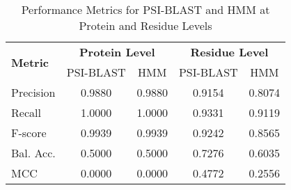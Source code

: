 \begin{table}[h!]
    \centering
    \small
    \caption{Performance Metrics for PSI-BLAST and HMM at Protein and Residue Levels}
    \label{tab:metrics}
    \begin{tabular}{lcccc}
        \toprule
        \multirow{2}{*}{\textbf{Metric}} & \multicolumn{2}{c}{\textbf{Protein Level}} & \multicolumn{2}{c}{\textbf{Residue Level}} \\
        \cmidrule(lr){2-3} \cmidrule(lr){4-5}
        & PSI-BLAST & HMM & PSI-BLAST & HMM \\
        \midrule
        Precision & 0.9880 & 0.9880 & 0.9154 & 0.8074 \\
        Recall & 1.0000 & 1.0000 & 0.9331 & 0.9119 \\
        F-score & 0.9939 & 0.9939 & 0.9242 & 0.8565 \\
        Bal. Acc. & 0.5000 & 0.5000 & 0.7276 & 0.6035 \\
        MCC & 0.0000 & 0.0000 & 0.4772 & 0.2556 \\
        \bottomrule
    \end{tabular}
\end{table}


